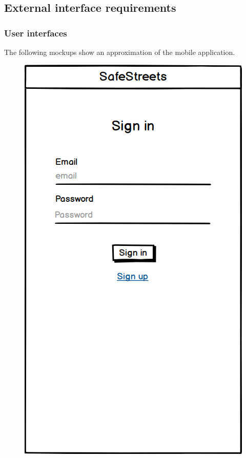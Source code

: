 \subsection{External interface requirements}
\subsubsection{User interfaces}
\begin{@empty}
The following mockups show an approximation of the mobile application.\\

\setlength{\intextsep}{10pt plus \textheight minus 10pt}

\begin{figure}[H]
\centering
\begin{minipage}{.4\textwidth}
    \centering
    \includegraphics[width=.8\textwidth]{Images/sign-in.png}

\end{minipage}
\end{figure}
\end{@empty}
